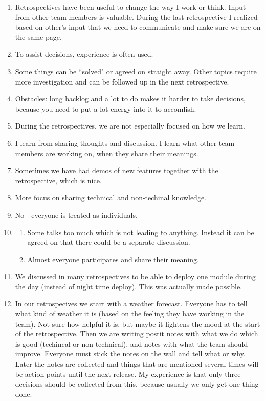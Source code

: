 \begin{enumerate}
\item Retrospectives have been useful to change the way I work or think. Input from other team members is valuable. During the last retrospective I realized based on other's input that we need to communicate and make sure we are on the same page.
\item To assist decisions, experience is often used.
\item Some things can be ``solved" or agreed on straight away. Other topics require more investigation and can be followed up in the next retrospective.
\item Obstacles: long backlog and a lot to do makes it harder to take decisions, because you need to put a lot energy into it to accomlish.
\item During the retrospectives, we are not especially focused on how we learn.
\item I learn from sharing thoughts and discussion. I learn what other team members are working on, when they share their meanings.
\item Sometimes we have had demos of new features together with the retrospective, which is nice.
\item More focus on sharing technical and non-techinal knowledge.
\item No - everyone is treated as individuals.
\item \begin{enumerate}
	\item Some talks too much which is not leading to anything. Instead it can be agreed on that there could be a separate discussion.
	\item Almost everyone participates and share their meaning.
\end{enumerate}
\item We discussed in many retrospectives to be able to deploy one module during the day (instead of night time deploy). This was actually made possible.
\item In our retrospecives we start with a weather forecast. Everyone has to tell what kind of weather it is (based on the feeling they have working in the team). Not sure how helpful it is, but maybe it lightens the mood at the start of the retrospective. Then we are writing postit notes with what we do which is good (techincal or non-technical), and notes with what the team should improve. Everyone must stick the notes on the wall and tell what or why. Later the notes are collected and things that are mentioned several times will be action points until the next release. My experience is that only three decisions should be collected from this, because usually we only get one thing done.
\end{enumerate}

